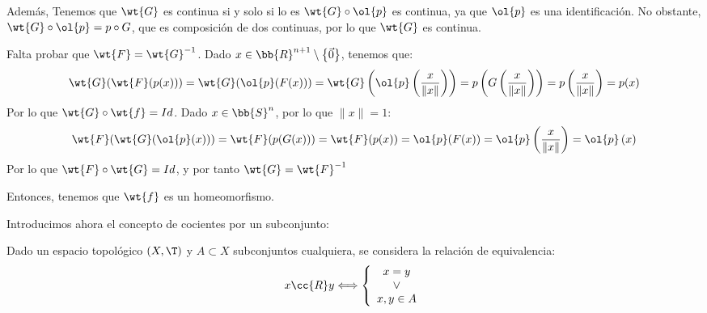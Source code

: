 \begin{ejemplo}
\begin{enumerate}
        Además, Tenemos que $\wt{G}$ es continua si y solo si lo es $\wt{G}\circ \ol{p}$ es continua, ya que $\ol{p}$ es una identificación. No obstante, $\wt{G}\circ \ol{p} = p\circ G$, que es composición de dos continuas, por lo que $\wt{G}$ es continua.

        Falta probar que $\wt{F}=\wt{G}^{-1}$. Dado $x\in \bb{R}^{n+1}\setminus\left\{\vec{0}\right\}$, tenemos que:
        \begin{equation*}
            \wt{G}(\wt{F}(p(x))) = \wt{G}(\ol{p}(F(x))) = \wt{G}\left(\ol{p}\left(\frac{x}{\|x\|}\right)\right) = p\left(G\left(\frac{x}{\|x\|}\right)\right) = p\left(\frac{x}{\|x\|}\right) = p(x)
        \end{equation*}
        Por lo que $\wt{G}\circ \wt{f}=Id$. Dado $x\in \bb{S}^n$, por lo que $\|x\|=1$:
        \begin{equation*}
            \wt{F}(\wt{G}(\ol{p}(x))) = \wt{F}(p(G(x))) = \wt{F}(p(x)) = \ol{p}(F(x)) = \ol{p}\left(\frac{x}{\|x\|}\right)
            = \ol{p}\left(x\right)
        \end{equation*}
        Por lo que $\wt{F}\circ \wt{G}=Id$, y por tanto $\wt{G}=\wt{F}^{-1}$

        Entonces, tenemos que $\wt{f}$ es un homeomorfismo.
    \end{enumerate}
    
    Introducimos ahora el concepto de cocientes por un subconjunto:
    \begin{definicion}
        Dado un espacio topológico $(X,\T)$ y $A\subset X$ subconjuntos cualquiera, se considera la relación de equivalencia:
        \begin{equation*}
            x\cc{R}y \Longleftrightarrow \left\{
            \begin{array}{c}
                x=y \\ \lor \\ x,y\in A
            \end{array}
            \right.
        \end{equation*}


\end{definicion}
\end{ejemplo}
